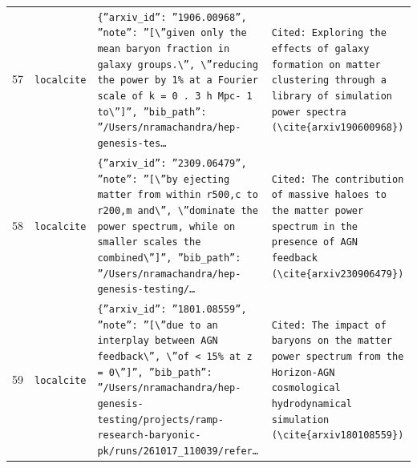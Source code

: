 \documentclass[11pt,a4paper]{article}
\begin{document}
\begin{longtable}{@{}p{}p{}p{}p{}@{}}
57 & \texttt{local}\newline\texttt{cite} & \texttt{\{''arxiv\_\allowbreak{}id'':\allowbreak{} ''1906.00968'',\allowbreak{} ''note'':\allowbreak{} ''[\textbackslash{}\allowbreak{}''given only the mean baryon fraction in galaxy groups.\textbackslash{}\allowbreak{}'',\allowbreak{} \textbackslash{}\allowbreak{}''reducing the power by 1\% at a Fourier scale of k =\allowbreak{} 0 . 3 h Mpc- 1 to\textbackslash{}\allowbreak{}'']\allowbreak{}'',\allowbreak{} ''bib\_\allowbreak{}path'':\allowbreak{} ''/\allowbreak{}Users/\allowbreak{}nramachandra/\allowbreak{}hep-genesis-tes\ldots{}\allowbreak{}} & \texttt{Cited:\allowbreak{} Exploring the effects of galaxy formation on matter clustering through a library of simulation power spectra (\textbackslash{}\allowbreak{}cite\{arxiv190600968\}\allowbreak{})\allowbreak{}} \\
58 & \texttt{local}\newline\texttt{cite} & \texttt{\{''arxiv\_\allowbreak{}id'':\allowbreak{} ''2309.06479'',\allowbreak{} ''note'':\allowbreak{} ''[\textbackslash{}\allowbreak{}''by ejecting matter from within r500,\allowbreak{}c to r200,\allowbreak{}m and\textbackslash{}\allowbreak{}'',\allowbreak{} \textbackslash{}\allowbreak{}''dominate the power spectrum,\allowbreak{} while on smaller scales the combined\textbackslash{}\allowbreak{}'']\allowbreak{}'',\allowbreak{} ''bib\_\allowbreak{}path'':\allowbreak{} ''/\allowbreak{}Users/\allowbreak{}nramachandra/\allowbreak{}hep-genesis-testing/\allowbreak{}\ldots{}\allowbreak{}} & \texttt{Cited:\allowbreak{} The contribution of massive haloes to the matter power spectrum in the presence of AGN feedback (\textbackslash{}\allowbreak{}cite\{arxiv230906479\}\allowbreak{})\allowbreak{}} \\
59 & \texttt{local}\newline\texttt{cite} & \texttt{\{''arxiv\_\allowbreak{}id'':\allowbreak{} ''1801.08559'',\allowbreak{} ''note'':\allowbreak{} ''[\textbackslash{}\allowbreak{}''due to an interplay between AGN feedback\textbackslash{}\allowbreak{}'',\allowbreak{} \textbackslash{}\allowbreak{}''of \textless{}\allowbreak{} 15\% at z =\allowbreak{} 0\textbackslash{}\allowbreak{}'']\allowbreak{}'',\allowbreak{} ''bib\_\allowbreak{}path'':\allowbreak{} ''/\allowbreak{}Users/\allowbreak{}nramachandra/\allowbreak{}hep-genesis-testing/\allowbreak{}projects/\allowbreak{}ramp-research-baryonic-pk/\allowbreak{}runs/\allowbreak{}261017\_\allowbreak{}110039/\allowbreak{}refer\ldots{}\allowbreak{}} & \texttt{Cited:\allowbreak{} The impact of baryons on the matter power spectrum from the Horizon-AGN cosmological hydrodynamical simulation (\textbackslash{}\allowbreak{}cite\{arxiv180108559\}\allowbreak{})\allowbreak{}} \\

\end{longtable}
\end{document}
